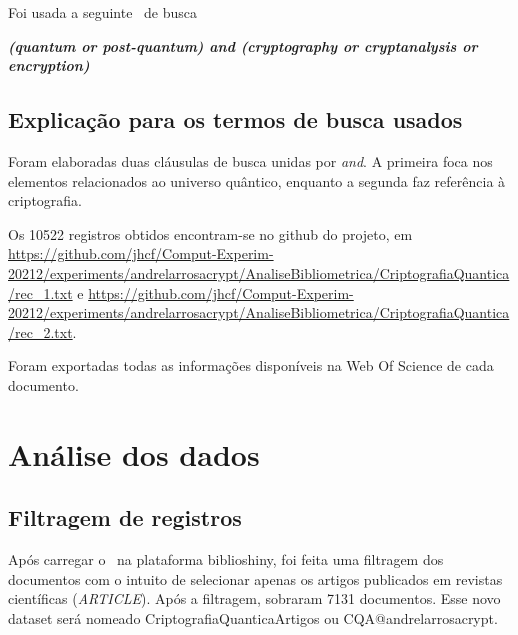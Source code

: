 Foi usada a seguinte \query\  de busca

\textit{\textbf{(quantum or  post-quantum) and (cryptography or cryptanalysis or encryption)}}




\subsection{Explicação para os termos de busca usados}

Foram elaboradas duas cláusulas de busca unidas por \textit{and}. A primeira foca nos elementos relacionados ao universo quântico, enquanto a segunda faz referência à criptografia.

Os 10522 registros obtidos encontram-se no github do projeto, em \url{https://github.com/jhcf/Comput-Experim-20212/experiments/andrelarrosacrypt/AnaliseBibliometrica/CriptografiaQuantica/rec_1.txt} e \url{https://github.com/jhcf/Comput-Experim-20212/experiments/andrelarrosacrypt/AnaliseBibliometrica/CriptografiaQuantica/rec_2.txt}. 

Foram exportadas todas as informações disponíveis na Web Of Science de cada documento.

\section{Análise dos dados}

\subsection{Filtragem de registros}


Após carregar o \dataset\ na plataforma biblioshiny, foi feita uma filtragem dos documentos com o intuito de selecionar apenas os artigos publicados em revistas científicas (\textit{ARTICLE}). Após a filtragem, sobraram 7131 documentos. Esse novo dataset será nomeado CriptografiaQuanticaArtigos ou CQA@andrelarrosacrypt.

